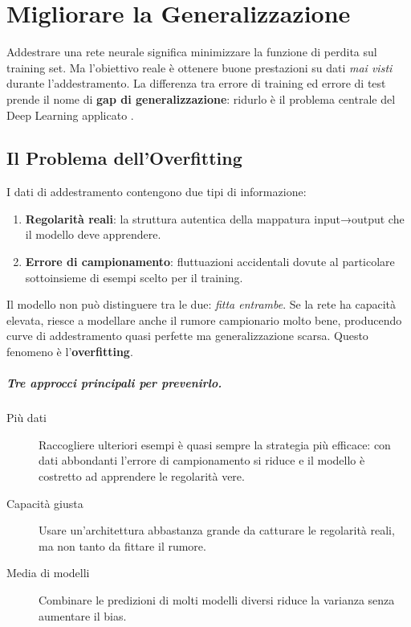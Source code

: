 \chapter{Migliorare la Generalizzazione}
\label{ch:generalization}

Addestrare una rete neurale significa minimizzare la funzione di perdita sul
training set. Ma l'obiettivo reale è ottenere buone prestazioni su dati
\emph{mai visti} durante l'addestramento. La differenza tra errore di training
ed errore di test prende il nome di \textbf{gap di generalizzazione}: ridurlo è
il problema centrale del Deep Learning applicato \citep{bishop2024}.

\section{Il Problema dell'Overfitting}
\label{sec:overfitting-recap}

I dati di addestramento contengono due tipi di informazione:

\begin{enumerate}
  \item \textbf{Regolarità reali}: la struttura autentica della mappatura
        input→output che il modello deve apprendere.
  \item \textbf{Errore di campionamento}: fluttuazioni accidentali dovute al
        particolare sottoinsieme di esempi scelto per il training.
\end{enumerate}

Il modello non può distinguere tra le due: \emph{fitta entrambe}. Se la rete ha
capacità elevata, riesce a modellare anche il rumore campionario molto bene,
producendo curve di addestramento quasi perfette ma generalizzazione scarsa.
Questo fenomeno è l'\textbf{overfitting}.

\paragraph{Tre approcci principali per prevenirlo.}
\begin{description}
  \item[Più dati] Raccogliere ulteriori esempi è quasi sempre la strategia più
        efficace: con dati abbondanti l'errore di campionamento si riduce e il
        modello è costretto ad apprendere le regolarità vere.
  \item[Capacità giusta] Usare un'architettura abbastanza grande da catturare le
        regolarità reali, ma non tanto da fittare il rumore.
  \item[Media di modelli] Combinare le predizioni di molti modelli diversi riduce
        la varianza senza aumentare il bias.
\end{description}

